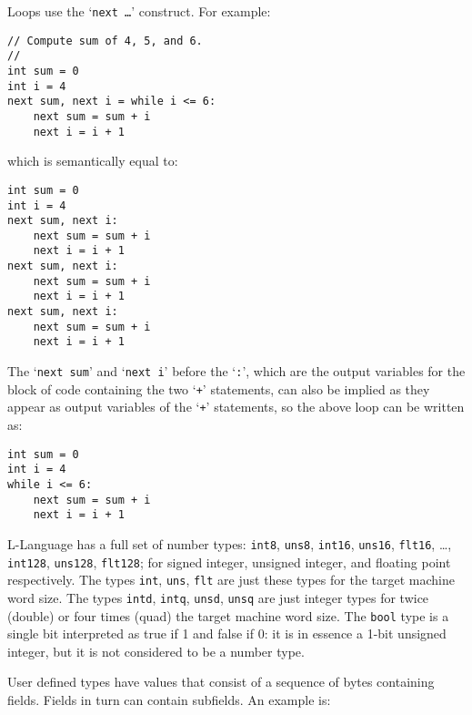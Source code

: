 \documentclass[12pt]{article}
\newenvironment{indpar}[1][0.3in]%
	{\begin{list}{}%
		     {\setlength{\itemsep}{0in}%
		      \setlength{\topsep}{0in}%
		      \setlength{\parsep}{1ex}%
		      \setlength{\labelwidth}{#1}%
		      \setlength{\leftmargin}{#1}%
		      \addtolength{\leftmargin}{\labelsep}}%
	 \item}%
	{\end{list}}
\begin{document}
Loops use the `{\tt next \ldots}' construct.  For example:
\begin{indpar}\begin{verbatim}
// Compute sum of 4, 5, and 6.
//
int sum = 0
int i = 4
next sum, next i = while i <= 6:
    next sum = sum + i
    next i = i + 1
\end{verbatim}\end{indpar}
which is semantically equal to:
\begin{indpar}\begin{verbatim}
int sum = 0
int i = 4
next sum, next i:
    next sum = sum + i
    next i = i + 1
next sum, next i:
    next sum = sum + i
    next i = i + 1
next sum, next i:
    next sum = sum + i
    next i = i + 1
\end{verbatim}\end{indpar}
The `{\tt next sum}' and `{\tt next i}' before the `{\tt :}',
which are the output variables for the block of code containing
the two `{\tt +}' statements,
can also be implied as they appear as output variables
of the `{\tt +}' statements, so the above loop can be written as:
\begin{indpar}\begin{verbatim}
int sum = 0
int i = 4
while i <= 6:
    next sum = sum + i
    next i = i + 1
\end{verbatim}\end{indpar}

L-Language has a full set of number types:
{\tt int8}, {\tt uns8},
{\tt int16}, {\tt uns16}, {\tt flt16}, \ldots,
{\tt int128}, {\tt uns128}, {\tt flt128}; for signed integer,
unsigned integer, and floating point respectively.
The types {\tt int}, {\tt uns}, {\tt flt} are just these
types for the target machine word size.
The types {\tt intd}, {\tt intq}, {\tt unsd}, {\tt unsq} are just integer
types for twice (double) or four times (quad) the target machine word size.
The {\tt bool} type is a single bit interpreted as true if
1 and false if 0: it is in essence a 1-bit unsigned integer, but it
is not considered to be a number type.

User defined types have values that
consist of a sequence of bytes containing fields.
Fields in turn can contain subfields.
An example is:
\end{document}
